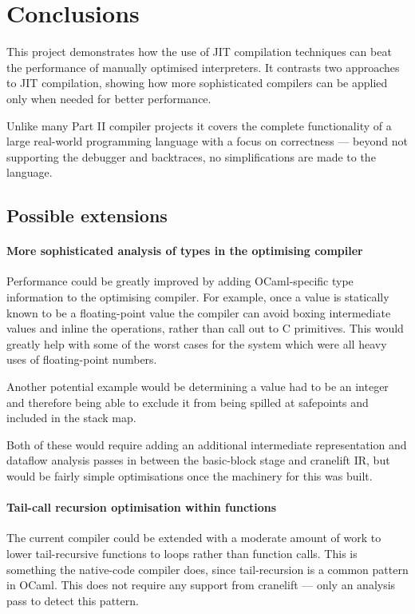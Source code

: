 \chapter{Conclusions}

This project demonstrates how the use of JIT compilation techniques can beat the performance
of manually optimised interpreters. It contrasts two approaches to JIT compilation, showing how
more sophisticated compilers can be applied only when needed for better performance.

Unlike many Part II compiler projects it covers the complete functionality of a large real-world
programming language with a focus on correctness --- beyond not supporting the debugger and
backtraces, no simplifications are made to the language.

\section{Possible extensions}

\subsubsection{More sophisticated analysis of types in the optimising compiler}

Performance could be greatly improved by adding OCaml-specific type information to the optimising
compiler. For example, once a value is statically known to be a floating-point value the compiler
can avoid boxing intermediate values and inline the operations, rather than call out to C
primitives. This would greatly help with some of the worst cases for the system which were all
heavy uses of floating-point numbers.

Another potential example would be determining a value had to be an integer and therefore being
able to exclude it from being spilled at safepoints and included in the stack map.

Both of these would require adding an additional intermediate representation and dataflow analysis
passes in between the basic-block stage and cranelift IR, but would be fairly simple optimisations
once the machinery for this was built.

\subsubsection{Tail-call recursion optimisation within functions}

The current compiler could be extended with a moderate amount of work to lower tail-recursive
functions to loops rather than function calls. This is something the native-code compiler does,
since tail-recursion is a common pattern in OCaml. This does not require any support from cranelift
--- only an analysis pass to detect this pattern.

